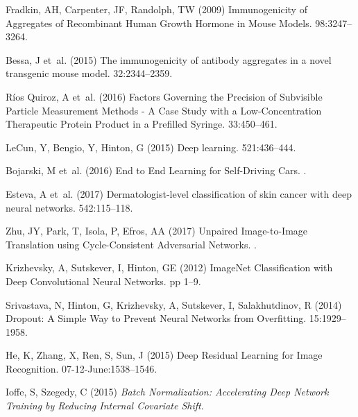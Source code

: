\documentclass[%
reprint,
superscriptaddress,
 aps,
 pre,
]{revtex4-1}
\begin{document}
\begin{thebibliography}{10}
Fradkin, AH, Carpenter, JF, Randolph, TW
\newblock (2009) {Immunogenicity of Aggregates of Recombinant Human Growth
  Hormone in Mouse Models}.
 98:3247--3264.

Bessa, J et~al.
\newblock (2015) {The immunogenicity of antibody aggregates in a novel
  transgenic mouse model}.
 32:2344--2359.

{R{\'{i}}os Quiroz}, A et~al.
\newblock (2016) {Factors Governing the Precision of Subvisible Particle
  Measurement Methods - A Case Study with a Low-Concentration Therapeutic
  Protein Product in a Prefilled Syringe}.
 33:450--461.

LeCun, Y, Bengio, Y, Hinton, G
\newblock (2015) {Deep learning}.
 521:436--444.

Bojarski, M et~al.
\newblock (2016) {End to End Learning for Self-Driving Cars}.
.

Esteva, A et~al.
\newblock (2017) {Dermatologist-level classification of skin cancer with deep
  neural networks}.
 542:115--118.

Zhu, JY, Park, T, Isola, P, Efros, AA
\newblock (2017) {Unpaired Image-to-Image Translation using Cycle-Consistent
  Adversarial Networks}.
.

Krizhevsky, A, Sutskever, I, Hinton, GE
\newblock (2012) {ImageNet Classification with Deep Convolutional Neural
  Networks}.
 pp 1--9.

Srivastava, N, Hinton, G, Krizhevsky, A, Sutskever, I, Salakhutdinov, R
\newblock (2014) {Dropout: A Simple Way to Prevent Neural Networks from
  Overfitting}.
 15:1929--1958.

He, K, Zhang, X, Ren, S, Sun, J
\newblock (2015) {Deep Residual Learning for Image Recognition}.
 07-12-June:1538--1546.

Ioffe, S, Szegedy, C
\newblock (2015) {\em {Batch Normalization: Accelerating Deep Network Training
  by Reducing Internal Covariate Shift}}.


\end{thebibliography}
\end{document}
